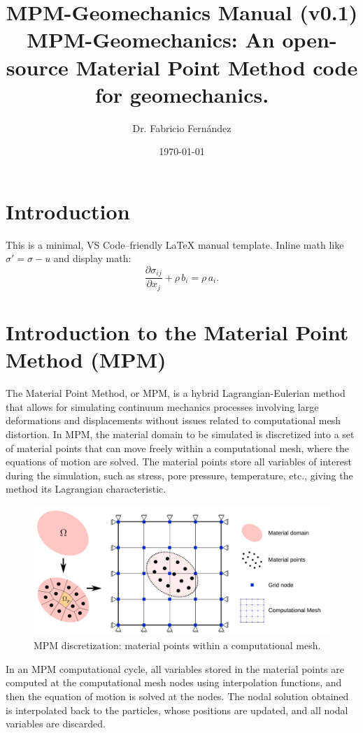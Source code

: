 \documentclass[11pt,a4paper]{article}
\title{\textbf{MPM-Geomechanics Manual (v0.1)} \\
  \large MPM-Geomechanics: An open-source Material Point Method code for geomechanics.}
\author{Dr. Fabricio Fernández}
\date{\today}
\begin{document}
\maketitle

\section{Introduction}
This is a minimal, VS Code--friendly LaTeX manual template.
Inline math like \( \sigma' = \sigma - u \) and display math:
$$
\frac{\partial \sigma_{ij}}{\partial x_j} + \rho\,b_i = \rho\,a_i.
$$

\section{ Introduction to the Material Point Method (MPM) }

The Material Point Method, or MPM, is a hybrid Lagrangian-Eulerian method that allows for simulating continuum mechanics processes involving large deformations and displacements without issues related to computational mesh distortion.
In MPM, the material domain to be simulated is discretized into a set of material points that can move freely within a computational mesh, where the equations of motion are solved.
The material points store all variables of interest during the simulation, such as stress, pore pressure, temperature, etc., giving the method its Lagrangian characteristic.

\begin{figure}[h]
  \centering
  \includegraphics[width=\linewidth]{figures/mpm_discretization.png}
  \caption{MPM discretization: material points within a computational mesh.}
  \label{fig:mpm_discretization}
\end{figure}

In an MPM computational cycle, all variables stored in the material points are computed at the computational mesh nodes using interpolation functions, and then the equation of motion is solved at the nodes. The nodal solution obtained is interpolated back to the particles, whose positions are updated, and all nodal variables are discarded.
\end{document}

